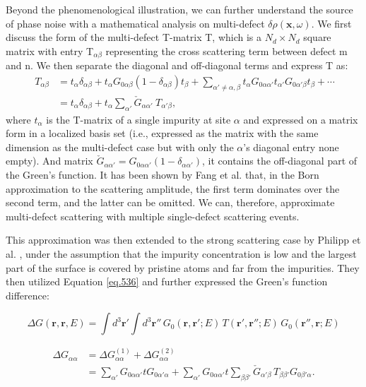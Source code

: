 Beyond the phenomenological illustration, we can further understand the source of phase noise with a mathematical analysis on multi-defect $\delta\rho(\textbf{x},\omega)$. We first discuss the form of the multi-defect T-matrix T, which is a $N_d \times N_d$ square matrix with entry T$_{\alpha \beta}$ representing the cross scattering term between defect m and n. We then separate the diagonal and off-diagonal terms and express T as\cite{leonard1972}:
\begin{align}
	\ T_{\alpha\beta} &= t_{\alpha} \delta_{\alpha\beta} + t_{\alpha} G_{0\alpha\beta} (1 - \delta_{\alpha\beta}) t_{\beta} + \sum_{\alpha' \neq \alpha, \beta} t_{\alpha} G_{0\alpha\alpha'} t_{\alpha'} G_{0\alpha'\beta} t_{\beta} + \cdots \label{eq_tmul}\\
	\label{eq.536}
	&= t_{\alpha} \delta_{\alpha\beta} + t_{\alpha} \sum_{\alpha'} \check{G}_{\alpha\alpha'} \ T_{\alpha'\beta},
\end{align}
\noindent where $t_{\alpha}$ is the T-matrix of a single impurity at site $\alpha$ and expressed on a matrix form in a localized basis set (i.e., expressed as the matrix with the same dimension as the multi-defect case but with only the $\alpha$'s diagonal entry none empty). And matrix $\check{G}_{\alpha\alpha'} = G_{0\alpha\alpha'}(1-\delta_{\alpha\alpha'})$, it contains the off-diagonal part of the Green's function. It has been shown by Fang et al. \cite{fangTheoryQuasiparticleInterference2013} that, in the Born approximation to the scattering amplitude, the first term dominates over the second term, and the latter can be omitted. We can, therefore, approximate multi-defect scattering with multiple single-defect scattering events. 

This approximation was then extended to the strong scattering case by Philipp et al. \cite{russmannInitioTheoryFourierTransformed2021}, under the assumption that the impurity concentration is low and the largest part of the surface is covered by pristine atoms and far from the impurities. They then utilized Equation \ref{eq.536} and further expressed the Green's function difference:

\[
\Delta G(\mathbf{r}, \mathbf{r}, E) = \int d^3 \mathbf{r}' \int d^3 \mathbf{r}'' \, G_0(\mathbf{r}, \mathbf{r}'; E) \, T(\mathbf{r}', \mathbf{r}''; E) \, G_0(\mathbf{r}'', \mathbf{r}; E)
\]

\begin{align}
	\label{eq.537}
	\Delta G_{\alpha \alpha} &= \Delta G^{(1)}_{\alpha \alpha} + \Delta G^{(2)}_{\alpha \alpha} \\
	\label{eq.538}
	&= \sum_{\alpha'} G_{0\alpha \alpha'} t G_{0\alpha' \alpha} + \sum_{\alpha'} G_{0\alpha \alpha'} t\sum_{\beta \beta'} \check{G}_{\alpha' \beta} \, T_{\beta \beta'} G_{0\beta' \alpha}.
\end{align}

